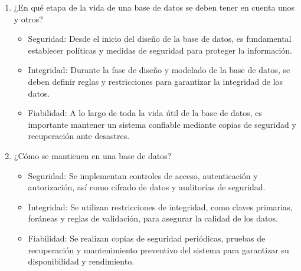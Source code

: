 \begin{enumerate}
        \item ¿En qué etapa de la vida de una base de datos se deben tener en cuenta unos y otros?
        
        \begin{itemize}
            \item Seguridad: Desde el inicio del diseño de la base de datos, es fundamental establecer políticas y medidas de seguridad para proteger la información.
            \item Integridad: Durante la fase de diseño y modelado de la base de datos, se deben definir reglas y restricciones para garantizar la integridad de los datos.
            \item Fiabilidad: A lo largo de toda la vida útil de la base de datos, es importante mantener un sistema confiable mediante copias de seguridad y recuperación ante desastres.
        \end{itemize}

        \item ¿Cómo se mantienen en una base de datos? 
        \begin{itemize}
            \item Seguridad: Se implementan controles de acceso, autenticación y autorización, así como cifrado de datos y auditorías de seguridad.
            \item Integridad: Se utilizan restricciones de integridad, como claves primarias, foráneas y reglas de validación, para asegurar la calidad de los datos.
            \item Fiabilidad: Se realizan copias de seguridad periódicas, pruebas de recuperación y mantenimiento preventivo del sistema para garantizar su disponibilidad y rendimiento.
        \end{itemize}
\end{enumerate}
